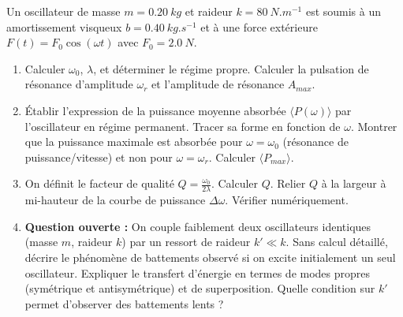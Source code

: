 \documentclass[11pt]{article}
\begin{document}
\begin{exercice}
Un oscillateur de masse $m = \SI{0,20}{kg}$ et raideur $k = \SI{80}{N.m^{-1}}$ est soumis à un amortissement visqueux $b = \SI{0,40}{kg.s^{-1}}$ et à une force extérieure $F(t) = F_0 \cos(\omega t)$ avec $F_0 = \SI{2,0}{N}$.
\begin{enumerate}
    \item Calculer $\omega_0$, $\lambda$, et déterminer le régime propre. Calculer la pulsation de résonance d'amplitude $\omega_r$ et l'amplitude de résonance $A_{max}$.
    \item Établir l'expression de la puissance moyenne absorbée $\langle P(\omega) \rangle$ par l'oscillateur en régime permanent. Tracer sa forme en fonction de $\omega$. Montrer que la puissance maximale est absorbée pour $\omega = \omega_0$ (résonance de puissance/vitesse) et non pour $\omega = \omega_r$. Calculer $\langle P_{max} \rangle$.
    \item On définit le facteur de qualité $Q = \frac{\omega_0}{2\lambda}$. Calculer $Q$. Relier $Q$ à la largeur à mi-hauteur de la courbe de puissance $\Delta\omega$. Vérifier numériquement.
    \item \textbf{Question ouverte :} On couple faiblement deux oscillateurs identiques (masse $m$, raideur $k$) par un ressort de raideur $k' \ll k$. Sans calcul détaillé, décrire le phénomène de battements observé si on excite initialement un seul oscillateur. Expliquer le transfert d'énergie en termes de modes propres (symétrique et antisymétrique) et de superposition. Quelle condition sur $k'$ permet d'observer des battements lents ?
\end{enumerate}
\end{exercice}
\end{document}
